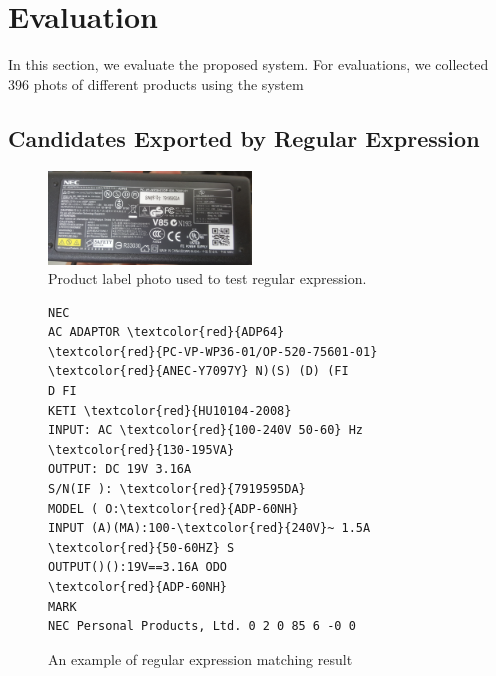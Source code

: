 \documentclass[technicalreport]{ieicej}
\begin{document}
\section{Evaluation}
\label{sec:evaluation}
    In this section, we evaluate the proposed system. For evaluations, we collected 396 phots of different products using the system

    \subsection{Candidates Exported by Regular Expression}

        \begin{figure}[t] 
            \begin{center}
            \includegraphics[width=0.48\textwidth]{figure/label-regex-samp.png}
            \end{center}
            \caption{Product label photo used to test regular expression.}
            \label{fig:label-regex-samp}
        \end{figure}

        \begin{figure}[t] 
            \begin{center}
                \begin{BVerbatim}[commandchars=\\\{\}]
NEC
AC ADAPTOR \textcolor{red}{ADP64}
\textcolor{red}{PC-VP-WP36-01/OP-520-75601-01}
\textcolor{red}{ANEC-Y7097Y} N)(S) (D) (FI
D FI
KETI \textcolor{red}{HU10104-2008}
INPUT: AC \textcolor{red}{100-240V 50-60} Hz \textcolor{red}{130-195VA}
OUTPUT: DC 19V 3.16A
S/N(IF ): \textcolor{red}{7919595DA}
MODEL ( O:\textcolor{red}{ADP-60NH}
INPUT (A)(MA):100-\textcolor{red}{240V}~ 1.5A \textcolor{red}{50-60HZ} S
OUTPUT()():19V==3.16A ODO
\textcolor{red}{ADP-60NH}
MARK
NEC Personal Products, Ltd. 0 2 0 85 6 -0 0
                \end{BVerbatim}
            \end{center}
            \caption{An example of regular expression matching result}
            \label{fig:result-regex}
        \end{figure}
\end{document}
